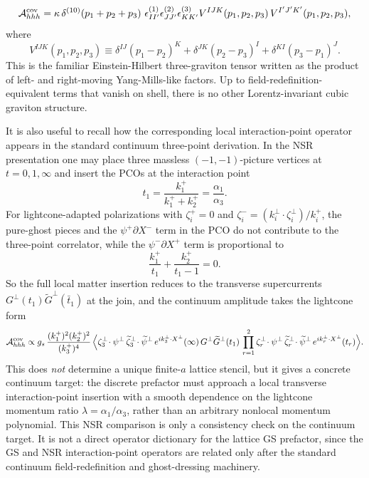 \documentclass[11pt]{article}
\numberwithin{equation}{section}
\begin{document}
\begin{equation}
\label{eq:s15-1-004}
{\cal A}_{hhh}^{\mathrm{cov}}
=
\kappa\,
\delta^{(10)}\!\left(p_1+p_2+p_3\right)\,
\epsilon_{II'}^{(1)}\epsilon_{JJ'}^{(2)}\epsilon_{KK'}^{(3)}
V^{IJK}(p_1,p_2,p_3)\,
V^{I'J'K'}(p_1,p_2,p_3),
\end{equation}
where
\begin{equation}
\label{eq:s15-1-005}
V^{IJK}(p_1,p_2,p_3)
\equiv
\delta^{IJ}(p_1-p_2)^K
+\delta^{JK}(p_2-p_3)^I
+\delta^{KI}(p_3-p_1)^J.
\end{equation}
This is the familiar Einstein-Hilbert three-graviton tensor written as the product of left- and right-moving Yang-Mills-like factors. Up to field-redefinition-equivalent terms that vanish on shell, there is no other Lorentz-invariant cubic graviton structure.

It is also useful to recall how the corresponding local interaction-point operator appears in the standard continuum three-point derivation. In the NSR presentation one may place three massless $(-1,-1)$-picture vertices at $t=0,1,\infty$ and insert the PCOs at the interaction point
\begin{equation}
\label{eq:s15-1-006}
t_1=\frac{k_1^+}{k_1^++k_2^+}=\frac{\alpha_1}{\alpha_3}.
\end{equation}
For lightcone-adapted polarizations with $\zeta_i^+=0$ and $\zeta_i^-=(k_i^\perp\!\cdot\zeta_i^\perp)/k_i^+$, the pure-ghost pieces and the $\psi^+\partial X^-$ term in the PCO do not contribute to the three-point correlator, while the $\psi^-\partial X^+$ term is proportional to
\begin{equation}
\label{eq:s15-1-007}
\frac{k_1^+}{t_1}+\frac{k_2^+}{t_1-1}=0.
\end{equation}
So the full local matter insertion reduces to the transverse supercurrents $G^\perp(t_1)\widetilde G^\perp(\bar t_1)$ at the join, and the continuum amplitude takes the lightcone form
\begin{equation}
\label{eq:s15-1-008}
{\cal A}_{hhh}^{\mathrm{cov}}
\propto
g_s\,
\frac{(k_1^+)^2(k_2^+)^2}{(k_3^+)^4}\,
\Big\langle
\zeta_3^\perp\!\cdot\psi^\perp\,
\widetilde\zeta_3^\perp\!\cdot\widetilde\psi^\perp\,
e^{ik_3^\perp\cdot X^\perp}(\infty)\,
G^\perp\widetilde G^\perp(t_1)\,
\prod_{r=1}^2
\zeta_r^\perp\!\cdot\psi^\perp\,
\widetilde\zeta_r^\perp\!\cdot\widetilde\psi^\perp\,
e^{ik_r^\perp\cdot X^\perp}(t_r)
\Big\rangle .
\end{equation}
This does \emph{not} determine a unique finite-$a$ lattice stencil, but it gives a concrete continuum target: the discrete prefactor must approach a local transverse interaction-point insertion with a smooth dependence on the lightcone momentum ratio $\lambda=\alpha_1/\alpha_3$, rather than an arbitrary nonlocal momentum polynomial.
This NSR comparison is only a consistency check on the continuum target. It is not a direct operator dictionary for the lattice GS prefactor, since the GS and NSR interaction-point operators are related only after the standard continuum field-redefinition and ghost-dressing machinery.
\end{document}
